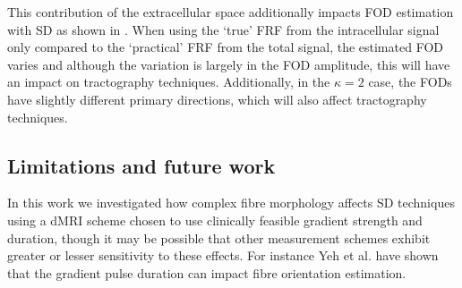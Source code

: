 This contribution of the extracellular space additionally impacts \ac{FOD} estimation with \acl{SD} as shown in .
When using the `true' \ac{FRF} from the intracellular signal only compared to the `practical' \ac{FRF} from the total signal, the estimated \ac{FOD} varies and although the variation is largely in the \ac{FOD} amplitude, this will have an impact on tractography techniques. Additionally, in the $\kappa=2$ case, the \ac{FOD}s have slightly different primary directions, which will also affect tractography techniques.

\subsection{Limitations and future work }
\label{sec:frf_limitations}
In this work we investigated how complex fibre morphology affects \acl{SD} techniques using a \ac{dMRI} scheme chosen to use clinically feasible gradient strength and duration, though it may be possible that other measurement schemes exhibit greater or lesser sensitivity to these effects. For instance Yeh et al. \cite{Yeh2010} have shown that the gradient pulse duration can impact fibre orientation estimation.

